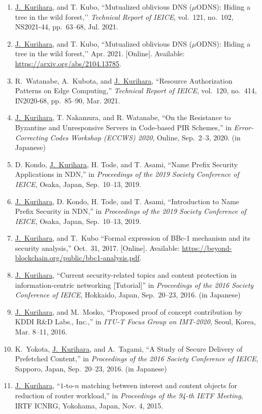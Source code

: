 \begin{enumerate}
 \item \underline{J.~Kurihara}, and T. Kubo, ``Mutualized oblivious DNS ($\mu$ODNS): Hiding a tree in the wild forest,’’ \textit{Technical Report of IEICE}, vol.~121, no.~102, NS2021-44, pp.~63--68, Jul. 2021.
 \item \underline{J.~Kurihara}, and T. Kubo, ``Mutualized oblivious DNS ($\mu$ODNS): Hiding a tree in the wild forest,’’ Apr. 2021. [Online]. Available: \url{https://arxiv.org/abs/2104.13785}.
\item R.~Watanabe, A.~Kubota, and \underline{J.~Kurihara}, ``Resource Authorization Patterns on Edge Computing,'' \textit{Technical Report of IEICE}, vol.~120, no.~414, IN2020-68, pp.~85--90, Mar. 2021.
 \item \underline{J.~Kurihara}, T. Nakamura, and R. Watanabe, ``On the Resistance to Byzantine and Unresponsive Servers in Code-based PIR Schemes,'' in \textit{Error-Correcting Codes Workshop (ECCWS) 2020}, Online, Sep.~2--3, 2020. (in Japanese)
 \item D. Kondo, \underline{J.~Kurihara}, H. Tode, and T. Asami, ``Name Prefix Security Applications in NDN,'' in \textit{Proceedings of the 2019 Society Conference of IEICE}, Osaka, Japan, Sep.~10--13, 2019.
 \item \underline{J.~Kurihara}, D. Kondo, H. Tode, and T. Asami, ``Introduction to Name Prefix Security in NDN,'' in \textit{Proceedings of the 2019 Society Conference of IEICE}, Osaka, Japan, Sep.~10--13, 2019.
 \item \underline{J.~Kurihara}, and T.~Kubo ``Formal expression of BBc-1 mechanism and its security analysis,'' Oct.~31, 2017. [Online]. Available: \url{https://beyond-blockchain.org/public/bbc1-analysis.pdf}.
 \item \underline{J.~Kurihara}, ``Current security-related topics and content protection in information-centric networking [Tutorial]'' in \textit{Proceedings of the 2016 Society Conference of IEICE}, Hokkaido, Japan, Sep.~20--23, 2016. (in Japanese)
 \item \underline{J.~Kurihara}, and M.~Mosko, ``Proposed proof of concept contribution by KDDI R\&D Labs., Inc.,'' in \textit{ITU-T Focus Group on IMT-2020}, Seoul, Korea, Mar. 8--11, 2016.
 \item K.~Yokota, \underline{J.~Kurihara}, and A.~Tagami, ``A Study of Secure Delivery of Prefetched Content,'' in \textit{Proceedings of the 2016 Society Conference of IEICE}, Sapporo, Japan, Sep.~20--23, 2016. (in Japanese)
 \item \underline{J.~Kurihara}, ``$1$-to-$n$ matching between interest and content objects for reduction of router workload,'' in \textit{Proceedings of the 94-th IETF Meeting}, IRTF ICNRG, Yokohama, Japan, Nov. 4, 2015.

\end{enumerate}
